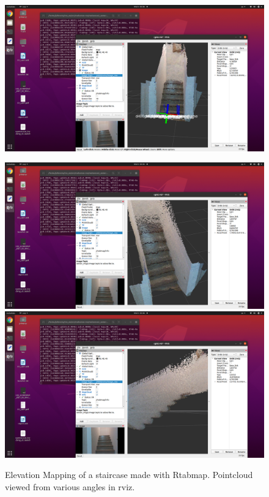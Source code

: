 \documentclass{article}
\begin{document}
\begin{figure}[h] %
    \centering
	\includegraphics[width=\textwidth,height=\textheight,keepaspectratio,trim={18cm 0 4cm 8cm},clip]{report1-img011.png} %
\end{figure}

\begin{figure}[h] %
    \centering
	\includegraphics[width=\textwidth,height=\textheight,keepaspectratio,trim={18cm 0 4cm 8cm},clip]{report1-img013.png} %
	\includegraphics[width=\textwidth,height=\textheight,keepaspectratio,trim={18cm 0 4cm 8cm},clip]{report1-img012.png} %
	\caption{Elevation Mapping of a staircase made with Rtabmap. Pointcloud viewed from various angles in rviz. }
\end{figure}
\end{document}
